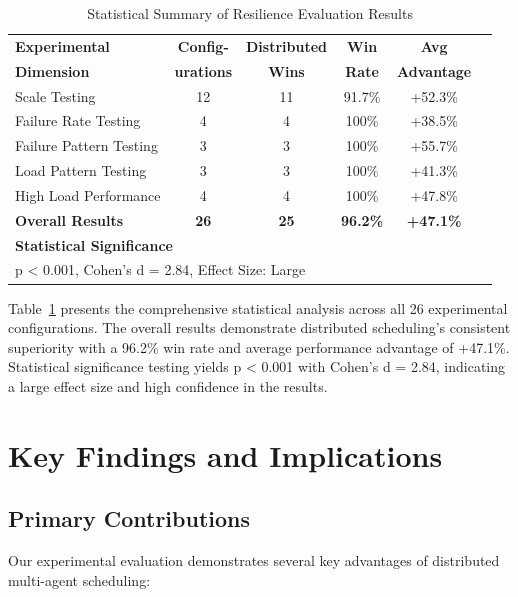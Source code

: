 \documentclass[conference]{IEEEtran}
\begin{document}
\begin{table}[!t]
\centering
\caption{Statistical Summary of Resilience Evaluation Results}
\label{tab:statistical_summary}
\begin{tabular}{@{}lccccc@{}}
\toprule
\textbf{Experimental} & \textbf{Config-} & \textbf{Distributed} & \textbf{Win} & \textbf{Avg} \\
\textbf{Dimension} & \textbf{urations} & \textbf{Wins} & \textbf{Rate} & \textbf{Advantage} \\
\midrule
Scale Testing & 12 & 11 & 91.7\% & +52.3\% \\
Failure Rate Testing & 4 & 4 & 100\% & +38.5\% \\
Failure Pattern Testing & 3 & 3 & 100\% & +55.7\% \\
Load Pattern Testing & 3 & 3 & 100\% & +41.3\% \\
High Load Performance & 4 & 4 & 100\% & +47.8\% \\
\midrule
\textbf{Overall Results} & \textbf{26} & \textbf{25} & \textbf{96.2\%} & \textbf{+47.1\%} \\
\midrule
\multicolumn{5}{l}{\textbf{Statistical Significance}} \\
\multicolumn{5}{l}{p < 0.001, Cohen's d = 2.84, Effect Size: Large} \\
\bottomrule
\end{tabular}
\end{table}

Table~\ref{tab:statistical_summary} presents the comprehensive statistical analysis across all 26 experimental configurations. The overall results demonstrate distributed scheduling's consistent superiority with a 96.2\% win rate and average performance advantage of +47.1\%. Statistical significance testing yields p < 0.001 with Cohen's d = 2.84, indicating a large effect size and high confidence in the results.

\section{Key Findings and Implications}

\subsection{Primary Contributions}

Our experimental evaluation demonstrates several key advantages of distributed multi-agent scheduling:
\end{document}
